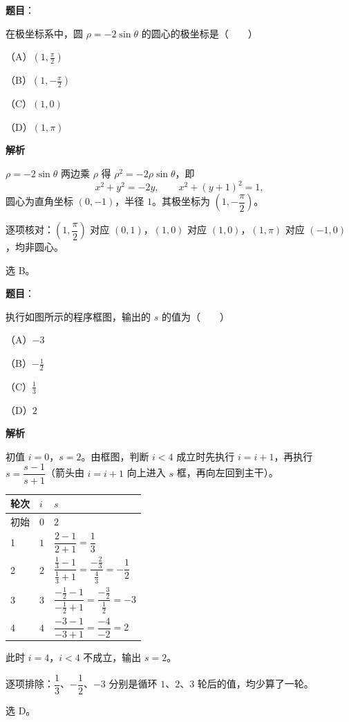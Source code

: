 \begin{answer}

\textbf{题目}：

在极坐标系中，圆 $\rho=-2\sin\theta$ 的圆心的极坐标是\mbox{（　　）}

（A）$\left(1,\frac{\pi}{2}\right)$

（B）$\left(1,-\frac{\pi}{2}\right)$

（C）$(1,0)$

（D）$(1,\pi)$

\textbf{解析}

$\rho=-2\sin\theta$ 两边乘 $\rho$ 得 $\rho^2=-2\rho\sin\theta$，即
\nopagebreak[4]
\[
x^2+y^2=-2y,\qquad x^2+(y+1)^2=1,
\]
圆心为直角坐标 $(0,-1)$，半径 $1$。其极坐标为 $\left(1,-\dfrac{\pi}{2}\right)$。

逐项核对：$\left(1,\dfrac{\pi}{2}\right)$ 对应 $(0,1)$，$(1,0)$ 对应 $(1,0)$，$(1,\pi)$ 对应 $(-1,0)$，均非圆心。

选 B。


\end{answer}
\begin{answer}

\textbf{题目}：

执行如图所示的程序框图，输出的 $s$ 的值为\mbox{（　　）}

（A）$-3$

（B）$-\frac12$

（C）$\frac13$

（D）$2$
\nopagebreak[4]
\begin{center}\end{center}
\nopagebreak[4]
\textbf{解析}

初值 $i=0$，$s=2$。由框图，判断 $i<4$ 成立时先执行 $i=i+1$，再执行 $s=\dfrac{s-1}{s+1}$（箭头由 $i=i+1$ 向上进入 $s$ 框，再向左回到主干）。

\begin{center}
\begin{tabular}{lll}
\toprule
轮次 & $i$ & $s$ \\
\midrule
初始 & $0$ & $2$ \\
1 & $1$ & $\dfrac{2-1}{2+1}=\dfrac13$ \\
2 & $2$ & $\dfrac{\frac13-1}{\frac13+1}=\dfrac{-\frac23}{\frac43}=-\dfrac12$ \\
3 & $3$ & $\dfrac{-\frac12-1}{-\frac12+1}=\dfrac{-\frac32}{\frac12}=-3$ \\
4 & $4$ & $\dfrac{-3-1}{-3+1}=\dfrac{-4}{-2}=2$ \\
\bottomrule
\end{tabular}
\end{center}

此时 $i=4$，$i<4$ 不成立，输出 $s=2$。

逐项排除：$\dfrac13$、$-\dfrac12$、$-3$ 分别是循环 $1$、$2$、$3$ 轮后的值，均少算了一轮。

选 D。


\end{answer}
